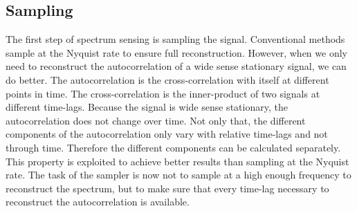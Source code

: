 \documentclass[a4paper, openany, oneside]{memoir}
\begin{document}
\subsection{Sampling}
The first step of spectrum sensing is sampling the signal. Conventional methods sample at the Nyquist rate to ensure full reconstruction. However, when we only need to reconstruct the autocorrelation of a wide sense stationary signal, we can do better.  The autocorrelation is the cross-correlation with itself at different points in time. The cross-correlation is the inner-product of two signals at different time-lags. Because the signal is wide sense stationary, the autocorrelation does not change over time. Not only that, the different components of the autocorrelation only vary with relative time-lags and not through time. Therefore the different components can be calculated separately. This property is exploited to achieve better results than sampling at the Nyquist rate. The task of the sampler is now not to sample at a high enough frequency to reconstruct the spectrum, but to make sure that every time-lag necessary to reconstruct the autocorrelation is available.
\end{document}
